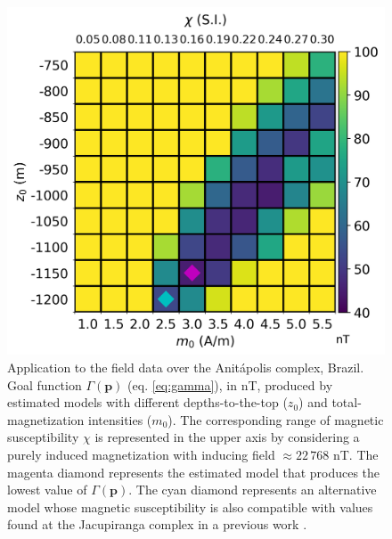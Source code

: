 \begin{figure}
	\centering
	\includegraphics[scale=.75]{figures/real_gamma.png}
	\caption{Application to the field data over the Anitápolis complex, Brazil. 
	Goal function $\Gamma(\mathbf{p})$ (eq. \ref{eq:gamma}), in nT,  
	produced by estimated models with different depths-to-the-top ($ z_0 $) and 
	total-magnetization intensities ($ m_0 $).
	The corresponding range of magnetic susceptibility $\chi$ is represented in the 
	upper axis by considering a purely induced magnetization with inducing field 
	$\approx 22 \, 768 $ nT.
	The magenta diamond represents the estimated model that produces the lowest value of $ \Gamma(\mathbf{p})$.
	The cyan diamond represents an alternative model whose magnetic susceptibility 
	is also compatible with values found at the Jacupiranga complex in a previous work 
	\citep[][ tb. 1]{valdivia-2009}.}
	\label{fig:real_map}
\end{figure}

